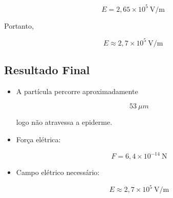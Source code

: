 \documentclass[a4paper,12pt]{article}
\newcommand{\printingbibliography}{%

    \pagestyle{myheadings}
    \markright{}
    \sloppy
    \printbibliography[heading=bibintoc, %
                   title=Refer\^encias %
                  ]
    \fussy%
}
\begin{document}
\begin{equation}
E = 2{,}65\times10^5 \ \text{V/m}
\end{equation}

Portanto,

\begin{equation}
\boxed{E \approx 2{,}7\times10^5 \ \text{V/m}}
\end{equation}

\hrulefill

\subsection*{Resultado Final}

\begin{itemize}

\item A partícula percorre aproximadamente

\begin{equation}
53 \ \mu m
\end{equation}

logo não atravessa a epiderme.

\item Força elétrica:

\begin{equation}
F = 6{,}4\times10^{-14} \ \text{N}
\end{equation}

\item Campo elétrico necessário:

\begin{equation}
E \approx 2{,}7\times10^5 \ \text{V/m}
\end{equation}

\end{itemize}

\printingbibliography
\end{document}
